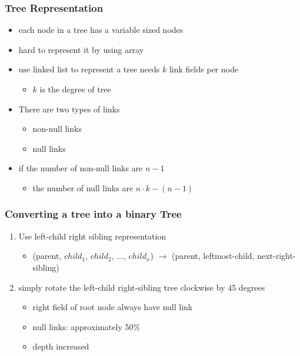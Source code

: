 \documentclass[newPxFont,sthlmFooter,nooffset]{beamer}
\begin{document}
\begin{frame}[t]
  \frametitle{Tree Representation}
  \begin{itemize}
  \item each node in a tree has a variable sized nodes
  \item hard to represent it by using array
  \item use linked list to represent a tree needs $k$ link fields per node
    \begin{itemize}
    \item  $k$ is the degree of tree
    \end{itemize}

  \item There are two types of links
    \begin{itemize}
    \item non-null links
    \item null links
    \end{itemize}
  \item if the number of non-null links are $n-1$
    \begin{itemize}
    \item the number of null links are $n \cdot k - (n-1)$
    \end{itemize}

  \end{itemize}
\end{frame}


\begin{frame}[t]
  \frametitle{Converting a tree into a binary Tree}
  \begin{enumerate}
  \item Use left-child right sibling representation
    \begin{itemize}
    \item (parent, $child_1$, $child_2$, $\ldots$, $child_x$)
      $\rightarrow$ (parent, leftmost-child, next-right-sibling)
    \end{itemize}

   \item simply rotate the left-child right-sibling tree clockwise by 45 degrees
     \begin{itemize}
     \item right field of root node always have null link
     \item null links: approximately 50$\%$
     \item depth increased
     \end{itemize}

  \end{enumerate}
\end{frame}
\end{document}

